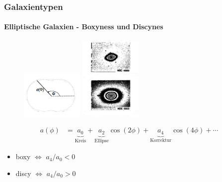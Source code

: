 \begin{frame}
\frametitle{Galaxientypen}
\framesubtitle{Elliptische Galaxien - Boxyness und Discynes}


\begin{figure}
\begin{minipage}[hbt]{4cm}
	\centering
	\includegraphics[width=3cm]{boxi_diski_Schema.jpg}
\end{minipage}
%
\begin{minipage}[hbt]{4cm}
	\includegraphics[width=3cm]{boxi_diski_Bild.jpg}
\end{minipage}
\end{figure}


\begin{align*}
a(\phi) &= \underbrace{a_0}_{\text{Kreis}} + \underbrace{a_2}_{\text{Ellipse}} \cos(2 \phi) + \underbrace{a_4}_{\text{Korrektur}} \cos(4 \phi) + \cdots
\end{align*}

\begin{itemize}
\item boxy $\iff$ $a_4/a_0 < 0$ 
\item discy $\iff$ $a_4/a_0 > 0$
\end{itemize}


\end{frame}



